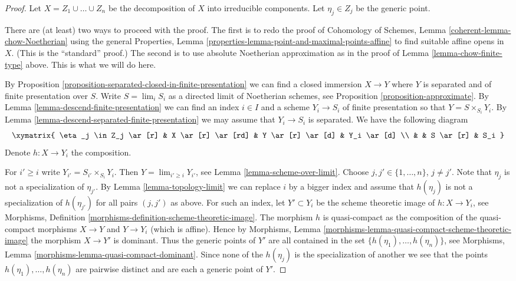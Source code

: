 \begin{proof}
Let $X = Z_1 \cup \ldots \cup Z_n$ be the decomposition of $X$
into irreducible components. Let $\eta_j \in Z_j$ be the generic point.

\medskip\noindent
There are (at least) two ways to proceed with the proof.
The first is to redo the proof of
Cohomology of Schemes, Lemma \ref{coherent-lemma-chow-Noetherian}
using the general
Properties, Lemma \ref{properties-lemma-point-and-maximal-points-affine}
to find suitable affine opens in $X$. (This is the ``standard'' proof.)
The second is to use absolute Noetherian approximation as in
the proof of Lemma \ref{lemma-chow-finite-type} above.
This is what we will do here.

\medskip\noindent
By Proposition \ref{proposition-separated-closed-in-finite-presentation}
we can find a closed immersion $X \to Y$ where $Y$ is separated
and of finite presentation over $S$.
Write $S = \lim_i S_i$ as a directed limit of Noetherian schemes, see
Proposition \ref{proposition-approximate}. By
Lemma \ref{lemma-descend-finite-presentation} we can
find an index $i \in I$ and a scheme $Y_i \to S_i$ of finite presentation
so that $Y = S \times_{S_i} Y_i$.
By Lemma \ref{lemma-descend-separated-finite-presentation}
we may assume that $Y_i \to S_i$ is separated.
We have the following diagram
$$
\xymatrix{
\eta_j \in Z_j \ar[r] & X \ar[r] \ar[rd] & Y \ar[r] \ar[d] & Y_i \ar[d] \\
& & S \ar[r] & S_i
}
$$
Denote $h : X \to Y_i$ the composition.

\medskip\noindent
For $i' \geq i$ write $Y_{i'} = S_{i'} \times_{S_i} Y_i$.
Then $Y = \lim_{i' \geq i} Y_{i'}$, see
Lemma \ref{lemma-scheme-over-limit}.
Choose $j, j' \in \{1, \ldots, n\}$, $j \not = j'$.
Note that $\eta_j$ is not a specialization of $\eta_{j'}$.
By Lemma \ref{lemma-topology-limit}
we can replace $i$ by a bigger index and assume
that $h(\eta_j)$ is not a specialization of $h(\eta_{j'})$
for all pairs $(j, j')$ as above.
For such an index, let
$Y' \subset Y_i$ be the scheme theoretic image of
$h : X \to Y_i$, see
Morphisms, Definition \ref{morphisms-definition-scheme-theoretic-image}.
The morphism $h$ is quasi-compact as the composition of the quasi-compact
morphisms $X \to Y$ and $Y \to Y_i$ (which is affine).
Hence by
Morphisms, Lemma \ref{morphisms-lemma-quasi-compact-scheme-theoretic-image}
the morphism $X \to Y'$ is dominant. Thus the generic points
of $Y'$ are all contained in the set
$\{h(\eta_1), \ldots, h(\eta_n)\}$, see
Morphisms, Lemma \ref{morphisms-lemma-quasi-compact-dominant}.
Since none of the $h(\eta_j)$ is the specialization of another
we see that the points $h(\eta_1), \ldots, h(\eta_n)$ are pairwise
distinct and are each a generic point of $Y'$.


\end{proof}
